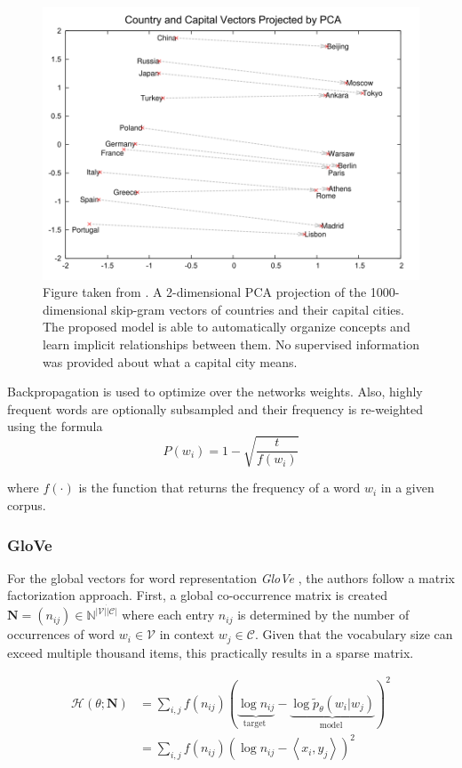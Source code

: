 \documentclass[a4paper,12pt,twoside,openright]{report}
\begin{document}
\begin{figure}[h]
	\center
  \includegraphics[width=0.6\linewidth]{./assets/background/word2vec_cities.png}
  \caption{Figure taken from \cite{mikolov13b}. A 2-dimensional PCA projection of the 1000-dimensional skip-gram vectors of countries and their capital cities. The proposed model is able to automatically organize concepts and learn implicit relationships between them. No supervised information was provided about what a capital city means.}
  \label{fig:cbow_skipgram}
\end{figure}


Backpropagation is used to optimize over the networks weights. 
Also, highly frequent words are optionally subsampled and their frequency is re-weighted using the formula $$
P\left(w_{i}\right)=1-\sqrt{\frac{t}{f\left(w_{i}\right)}}
$$

where $f( \cdot )$ is the function that returns the frequency of a word $w_i$ in a given corpus.

\subsubsection{GloVe}

For the global vectors for word representation \textit{GloVe} \cite{pennington14}, the authors follow a matrix factorization approach.
First, a global co-occurrence matrix is created $\mathbf{N} = (n_{ij}) \in \mathbb{N}^{|\mathcal{V}| \dot |\mathcal{C}|}$ where each entry $n_{ij}$ is determined by the number of occurrences of word $w_i \in \mathcal{V}$ in context $w_j \in \mathcal{C}$.
Given that the vocabulary size can exceed multiple thousand items, this practically results in a sparse matrix.

\begin{align}
\mathcal{H}(\theta ; \mathbf{N}) &=
\sum_{i, j} f\left(n_{i j}\right)(\underbrace{\log n_{i j}}_{\text {target }}-\underbrace{\log \tilde{p}_{\theta}\left(w_{i} | w_{j}\right)}_{\text {model }})^{2} \\
&= \sum_{i, j} f\left(n_{i j}\right)(\log n_{i j} - \left\langle x_i, y_j \right\rangle )^{2} \\
\end{align}
\end{document}
